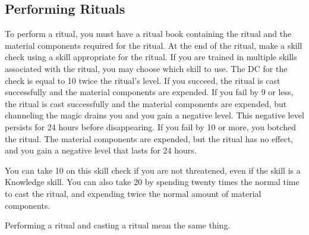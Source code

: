 \subsection{Performing Rituals}
\par To perform a ritual, you must have a ritual book containing the ritual and the material components required for the ritual. At the end of the ritual, make a skill check using a skill appropriate for the ritual. If you are trained in multiple skills associated with the ritual, you may choose which skill to use. The DC for the check is equal to 10 \add twice the ritual's level. If you succeed, the ritual is cast successfully and the material components are expended. If you fail by 9 or less, the ritual is cast successfully and the material components are expended, but channeling the magic drains you and you gain a negative level. This negative level persists for 24 hours before disappearing. If you fail by 10 or more, you botched the ritual. The material components are expended, but the ritual has no effect, and you gain a negative level that lasts for 24 hours.
\par You can take 10 on this skill check if you are not threatened, even if the skill is a Knowledge skill. You can also take 20 by spending twenty times the normal time to cast the ritual, and expending twice the normal amount of material components.
\par Performing a ritual and casting a ritual mean the same thing.
